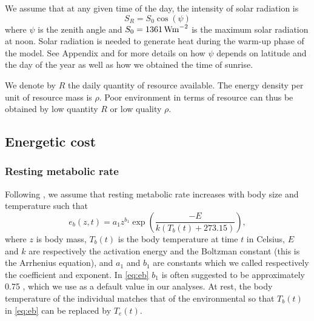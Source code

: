 We assume that  at any given time of the day, the intensity of solar radiation is \[S_R = S_0 \cos(\psi) \]
where $\psi$ is the zenith angle and $S_0 = 1361 \, \rm{W m}^{-2}$ is the maximum solar radiation at noon.
Solar radiation is needed to generate heat during the warm-up phase of the model.
See Appendix  and   \citet{Campbell2012} for more details on how $\psi$ depends on latitude and the day of the year as well as how we obtained the time of sunrise.

We denote by $R$ the daily quantity of resource available.
The energy density per unit of resource mass is $\rho$. 
Poor environment in terms of resource can thus be obtained by low quantity $R$ or low quality $\rho$.

\subsection*{Energetic cost}
\subsubsection*{Resting metabolic rate}
Following \citet{Brown2004}, we assume that resting metabolic rate increases with body size and temperature such that
\begin{equation} \label{eq:eb}
	e_b(z, t) = a_1 z^{b_1} \exp \left(\frac{-E}{k (T_b(t)+ 273.15)}\right),
\end{equation}
where $z$ is body mass, $T_b(t)$ is the body temperature at time $t$ in Celsius, $E$ and $k$ are respectively the activation energy and the Boltzman constant (this is the Arrhenius equation), and $a_1$ and $b_1$ are constants which we called respectively the coefficient and exponent.
In \cref{eq:eb} $b_1$ is often suggested to be approximately 0.75 \citep{Kleiber1947, Peters1986, Brown2004}, which we use as a default value in our analyses.
At rest, the body temperature of the individual matches that of the environmental \citep[e.g.,][]{Bartholomew1978} so that $T_b(t)$ in \cref{eq:eb} can be replaced by $T_e(t)$.


